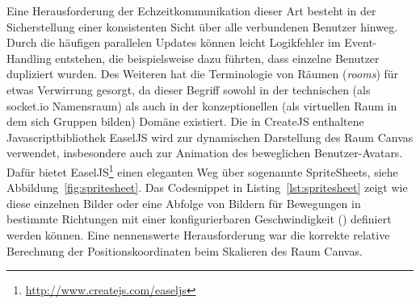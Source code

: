 Eine Herausforderung der Echzeitkommunikation dieser Art besteht in der Sicherstellung einer konsistenten Sicht über alle verbundenen Benutzer hinweg. Durch die häufigen parallelen Updates können leicht Logikfehler im Event-Handling entstehen, die beispielsweise dazu führten, dass einzelne Benutzer dupliziert wurden. Des Weiteren hat die Terminologie von Räumen (\emph{rooms}) für etwas Verwirrung gesorgt, da dieser Begriff sowohl in der technischen (als socket.io Namensraum) als auch in der konzeptionellen (als virtuellen Raum in dem sich Gruppen bilden) Domäne existiert.
\newline\newline
Die in CreateJS enthaltene Javascriptbibliothek EaselJS wird zur dynamischen Darstellung des Raum Canvas verwendet, insbesondere auch zur Animation des beweglichen Benutzer-Avatars. Dafür bietet EaselJS\footnote{\url{http://www.createjs.com/easeljs}} einen eleganten Weg über sogenannte SpriteSheets, siehe Abbildung~\ref{fig:spritesheet}. Das Codesnippet in Listing~\ref{lst:spritesheet} zeigt wie diese einzelnen Bilder oder eine Abfolge von Bildern für Bewegungen in bestimmte Richtungen mit einer konfigurierbaren Geschwindigkeit () definiert werden können. Eine nennenswerte Herausforderung war die korrekte relative Berechnung der Positionskoordinaten beim Skalieren des Raum Canvas.

